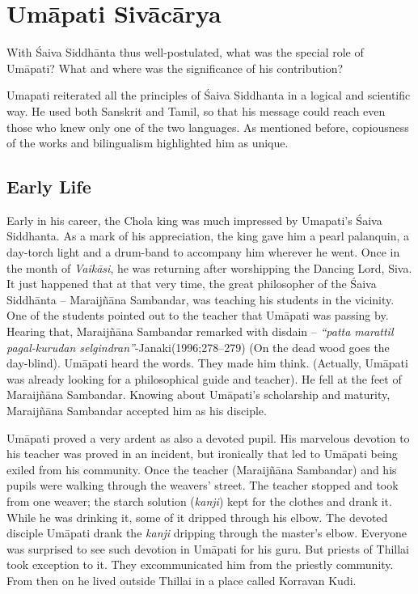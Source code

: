 \section{Umāpati Sivācārya}

With Śaiva Siddhānta thus well-postulated, what was the special role of Umāpati? What and where was the significance of his contribution?

Umapati reiterated all the principles of Śaiva Siddhanta in a logical and scientific way. He used both Sanskrit and Tamil, so that his message could reach even those who knew only one of the two languages. As mentioned before, copiousness of the works and bilingualism highlighted him as unique.

\subsection{Early Life}

Early in his career, the Chola king was much impressed by Umapati’s Śaiva Siddhanta. As a mark of his appreciation, the king gave him a pearl palanquin, a day-torch light and a drum-band to accompany him wherever he went. Once in the month of \textit{Vaikāsi}, he was returning after worshipping the Dancing Lord, Siva. It just happened that at that very time, the great philosopher of the Śaiva Siddhānta – Maraijñāna Sambandar, was teaching his students in the vicinity. One of the students pointed out to the teacher that Umāpati was passing by. Hearing that, Maraijñāna Sambandar remarked with disdain – \textit{“patta marattil pagal-kurudan selgindran”}-Janaki(1996;278–279) (On the dead wood goes the day-blind). Umāpati heard the words. They made him think. (Actually, Umāpati was already looking for a philosophical guide and teacher). He fell at the feet of Maraijñāna Sambandar. Knowing about Umāpati’s scholarship and maturity, Maraijñāna Sambandar accepted him as his disciple.

Umāpati proved a very ardent as also a devoted pupil. His marvelous devotion to his teacher was proved in an incident, but ironically that led to Umāpati being exiled from his community. Once the teacher (Maraijñāna Sambandar) and his pupils were walking through the weavers’ street. The teacher stopped and took from one weaver; the starch solution (\textit{kanji}) kept for the clothes and drank it. While he was drinking it, some of it dripped through his elbow. The devoted disciple Umāpati drank the \textit{kanji} dripping through the master’s elbow. Everyone was surprised to see such devotion in Umāpati for his guru. But priests of Thillai took exception to it. They excommunicated him from the priestly community. From then on he lived outside Thillai in a place called Korravan Kudi.

